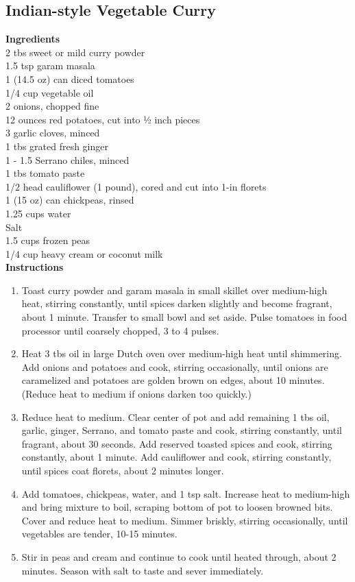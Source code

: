 \documentclass{article}
\numberwithin{figure}{section}
\numberwithin{equation}{section}
\begin{document}
\pagebreak
\subsection{Indian-style Vegetable Curry}
{\bf Ingredients}\\
2 tbs sweet or mild curry powder\\
1.5 tsp garam masala\\
1 (14.5 oz) can diced tomatoes\\
1/4 cup vegetable oil\\
2 onions, chopped fine\\
12 ounces red potatoes, cut into ½ inch pieces\\
3 garlic cloves, minced\\
1 tbs grated fresh ginger\\
1 - 1.5 Serrano chiles, minced\\
1 tbs tomato paste\\
1/2 head cauliflower (1 pound), cored and cut into 1-in florets\\
1 (15 oz) can chickpeas, rinsed\\
1.25 cups water\\
Salt\\
1.5 cups frozen peas\\
1/4 cup heavy cream or coconut milk\\

{\bf Instructions}
\begin{enumerate}
\item Toast curry powder and garam masala in small skillet over medium-high heat, stirring constantly, until spices darken slightly and become fragrant, about 1 minute.  Transfer to small bowl and set aside.  Pulse tomatoes in food processor until coarsely chopped, 3 to 4 pulses.
\item Heat 3 tbs oil in large Dutch oven over medium-high heat until shimmering.  Add onions and potatoes and cook, stirring occasionally, until onions are caramelized and potatoes are golden brown on edges, about 10 minutes.  (Reduce heat to medium if onions darken too quickly.)
\item Reduce heat to medium.  Clear center of pot and add remaining 1 tbs oil, garlic, ginger, Serrano, and tomato paste and cook, stirring constantly, until fragrant, about 30 seconds.  Add reserved toasted spices and cook, stirring constantly, about 1 minute.  Add cauliflower and cook, stirring constantly, until spices coat florets, about 2 minutes longer.  
\item Add tomatoes, chickpeas, water, and 1 tsp salt.  Increase heat to medium-high and bring mixture to boil, scraping bottom of pot to loosen browned bits.  Cover and reduce heat to medium.  Simmer briskly, stirring occasionally, until vegetables are tender, 10-15 minutes.
\item Stir in peas and cream and continue to cook until heated through, about 2 minutes.  Season with salt to taste and sever immediately.
\end{enumerate}
\end{document}
